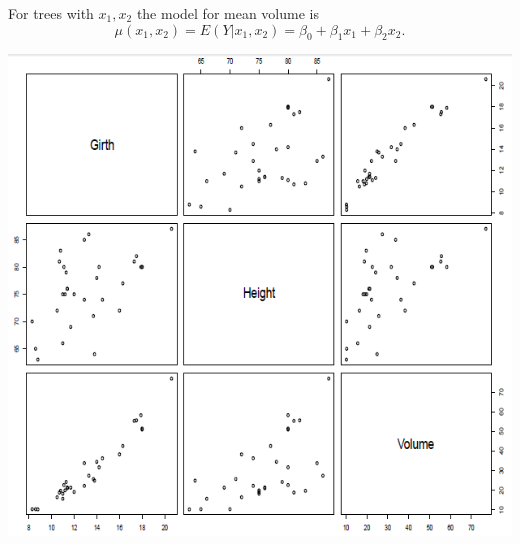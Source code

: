 For trees with $x_1,x_2$ the model for mean volume is 
$$ \mu(x_1,x_2) = E(Y|x_1,x_2) = \beta_0 + \beta_1 x_1 + \beta_2 x_2.$$ 
\begin{center}
\includegraphics[scale=0.5]{treescatter}
\end{center}
\newpage

